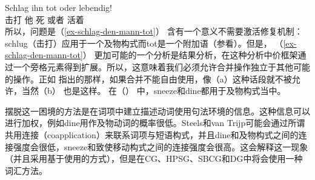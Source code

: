 \ea
\gll Schlag ihn tot oder lebendig!\\
     击打   他 死 或者 活着\\
\z
所以，问题是（\ref{ex-schlag-den-mann-tot}） 含有一个意义不需要激活修复机制：schlug（击打）应用于一个及物构式而tot是一个附加语（参看\citealp{Winkler97a}）。但是， （\ref{ex-schlag-den-mann-tot}） 更加可能的一个分析是结果分析，在这种分析中价框架通过一个旁格元素得到扩展。所以，这意味着我们必须允许合并操作独立于其他可能的操作。正如 \citet[]{SvT2011a}指出的那样，如果合并不能自由使用，像（a）这种话段就不被允许，当然（b） 也是这样。
\eal
{}
\zl
在（） 中，sneeze和dine都用于及物构式当中。

摆脱这一困境的方法是在词项中建立描述动词使用句法环境的信息。这种信息可以进行加权，例如dine用作及物动词的概率很低。Steels和van Trijp可能会通过所谓共用连接（coapplication）来联系词项与短语构式，并且dine和及物构式之间的连接强度会很低，sneeze和致使移动构式之间的连接强度会很高。这会解释这一现象（并且采用基于使用的方式），但是在CG、HPSG、SBCG和DG中将会使用一种词汇方法。

